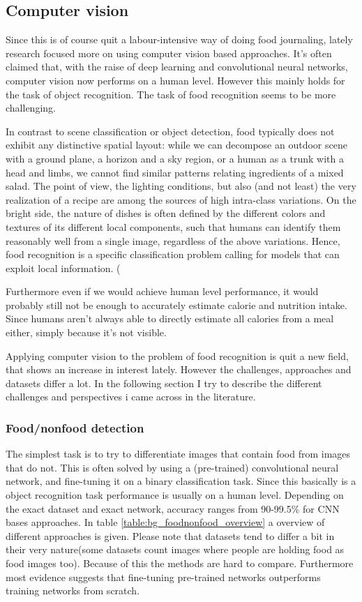 \documentclass[a4paper]{scrartcl}
\begin{document}
\subsection{Computer vision}
Since this is of course quit a labour-intensive way of doing food journaling, lately research focused more on using computer vision based approaches. It's often claimed that, with the raise of deep learning and convolutional neural networks, computer vision now performs on a human level. However this mainly holds for the task of object recognition. The task of food recognition seems to be more challenging.  
\begin{displayquote}
In contrast to scene classification or object detection, food typically does not exhibit any distinctive spatial layout: while we can decompose an outdoor scene with a ground plane, a horizon and a sky region, or a human as a trunk with a head and limbs, we cannot find similar patterns relating ingredients of a mixed salad. The point of view, the lighting conditions, but also (and not least) the very realization of a recipe are among the sources of high intra-class variations. On the bright side, the nature of dishes is often defined by the different colors and textures of its different local components, such that humans can identify them reasonably well from a single image, regardless of the above variations. Hence, food recognition is a specific classification problem calling for models that can exploit local information. ( \cite{bossard2014food}
\end{displayquote}  
Furthermore even if we would achieve human level performance, it would probably still not be enough to accurately estimate calorie and nutrition intake. Since humans aren't always able to directly estimate all calories from a meal either, simply because it's not visible. 

Applying computer vision to the problem of food recognition is quit a new field, that shows an increase in interest lately. However the challenges, approaches and datasets differ a lot. In the following section I try to describe the different challenges and perspectives i came across in the literature. 
\subsubsection{Food/nonfood detection}
The simplest task is to try to differentiate images that contain food from images that do not. This is often solved by using a (pre-trained) convolutional neural network, and fine-tuning it on a binary classification task. Since this basically is a object recognition task performance is usually on a human level. Depending on the exact dataset and exact network, accuracy ranges from 90-99.5\% for CNN bases approaches. In table \ref{table:bg_foodnonfood_overview} a overview of different approaches is given. Please note that datasets tend to differ a bit in their very nature(some datasets count images where people are holding food as food images too). Because of this the methods are hard to compare. Furthermore most evidence suggests that fine-tuning pre-trained networks outperforms training networks from scratch. 
\end{document}
